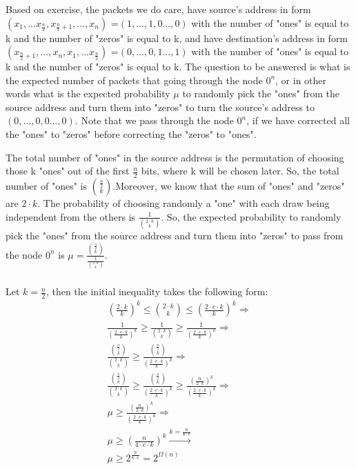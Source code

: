 \documentclass[11pt]{537homework}
\begin{document}
\subsubsection{}
Based on exercise, the packets we do care, have source's address in form $(x_1,...x_{\frac{n}{2}},x_{\frac{n}{2}+1},...,x_n)$ =$(1,...,1,0...,0)$ with the number of "ones" is equal to k and the number of "zeros" is equal to k, and have destination's address in form   $(x_{\frac{n}{2}+1},...,x_n,x_1,...x_{\frac{n}{2}})$ =$(0,...,0,1...,1)$ with the number of "ones" is equal to k and the number of "zeros" is equal to k. The question to be answered is what is the expected number of packets that going through the node $0^{n}$, or in other words what is the expected probability $\mu$ to randomly pick the "ones" from the source address and turn them into "zeros" to turn the source's address to $(0,...,0,0...,0)$. Note that we pass through the node $0^{n}$, if we have corrected all the "ones" to "zeros" before correcting the "zeros" to "ones".
\par The total number of "ones" in the source address is the permutation of choosing those k "ones" out of the first $\frac{n}{2}$ bits, where k will be chosen later. So, the total number of "ones" is $\displaystyle{{\frac{n}{2} \choose k}}$.Moreover, we know that the sum of "ones" and "zeros" are $2\cdot k$. The probability of choosing randomly a "one" with each draw being independent from the others is $\displaystyle{\frac{1}{{2\cdot k \choose k}}}$. So, the expected probability to randomly pick the "ones" from the source address and turn them into "zeros" to pass from the node $0^n$ is  $\mu = \displaystyle{\frac{{\frac{n}{2} \choose k}}{\frac{1}{{2\cdot k \choose k}}}}$.
\subsubsection{}
Let $k = \frac{n}{2}$, then the initial inequality takes the following form:
\begin{align*}
(\frac{2\cdot k}{k})^k \leq {2\cdot k \choose k} \leq (\frac{2\cdot e \cdot k}{k})^k \Longrightarrow \\
\frac{1}{(\frac{2\cdot e \cdot k}{k})^k} \geq \frac{1}{{2\cdot k \choose k}} \geq  \frac{1}{(\frac{2\cdot e \cdot k}{k})^k} \Longrightarrow \\
\frac{{\frac{n}{2} \choose k}}{{2\cdot k \choose k}} \geq  \frac{{\frac{n}{2} \choose k}}{(\frac{2\cdot e \cdot k}{k})^k} \Longrightarrow \\
\frac{{\frac{n}{2} \choose k}}{{2\cdot k \choose k}} \geq \frac{{\frac{n}{2} \choose k}}{(\frac{2\cdot e \cdot k}{k})^k} \geq  \frac{(\frac{n}{2 \cdot k})^k}{(\frac{2\cdot e \cdot k}{k})^k} \Longrightarrow \\
\mu \geq \frac{(\frac{n}{2 \cdot k})^k}{(\frac{2\cdot e \cdot k}{k})^k} \Longrightarrow \\ 
\mu \geq (\frac{n}{4 \cdot e \cdot k})^k \xrightarrow{k = \frac{n}{8\cdot e}} \\ 
\mu \geq 2^{\frac{n}{8 \cdot e}} = 2^{\Omega(n)}
\end{align*}
\end{document}
